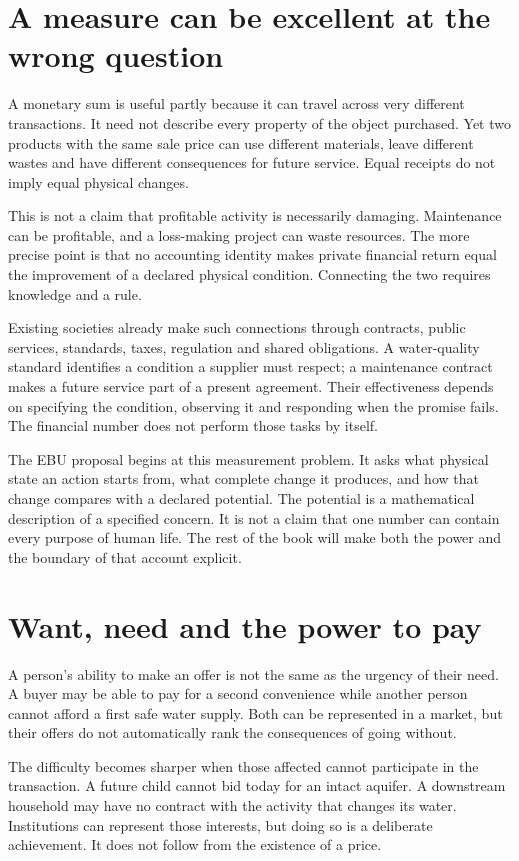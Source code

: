 \section{A measure can be excellent at the wrong question}
A monetary sum is useful partly because it can travel across very different transactions. It need not describe every property of the object purchased. Yet two products with the same sale price can use different materials, leave different wastes and have different consequences for future service. Equal receipts do not imply equal physical changes.

This is not a claim that profitable activity is necessarily damaging. Maintenance can be profitable, and a loss-making project can waste resources. The more precise point is that no accounting identity makes private financial return equal the improvement of a declared physical condition. Connecting the two requires knowledge and a rule.

Existing societies already make such connections through contracts, public services, standards, taxes, regulation and shared obligations. A water-quality standard identifies a condition a supplier must respect; a maintenance contract makes a future service part of a present agreement. Their effectiveness depends on specifying the condition, observing it and responding when the promise fails. The financial number does not perform those tasks by itself.

The EBU proposal begins at this measurement problem. It asks what physical state an action starts from, what complete change it produces, and how that change compares with a declared potential. The potential is a mathematical description of a specified concern. It is not a claim that one number can contain every purpose of human life. The rest of the book will make both the power and the boundary of that account explicit.

\section{Want, need and the power to pay}
A person's ability to make an offer is not the same as the urgency of their need. A buyer may be able to pay for a second convenience while another person cannot afford a first safe water supply. Both can be represented in a market, but their offers do not automatically rank the consequences of going without.

The difficulty becomes sharper when those affected cannot participate in the transaction. A future child cannot bid today for an intact aquifer. A downstream household may have no contract with the activity that changes its water. Institutions can represent those interests, but doing so is a deliberate achievement. It does not follow from the existence of a price.

